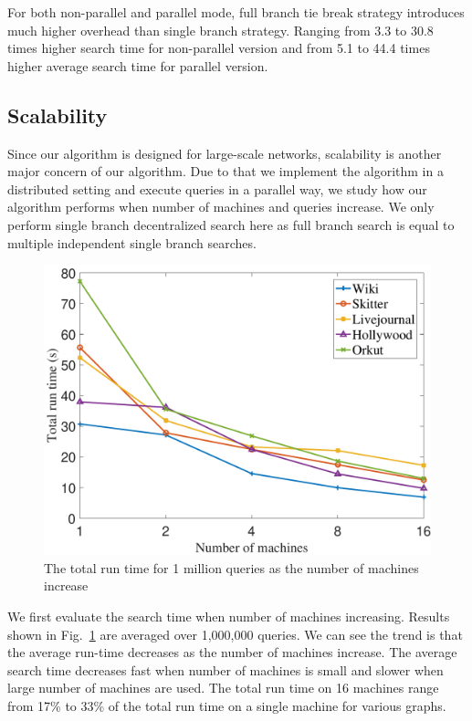 For both non-parallel and parallel mode, full branch tie break strategy introduces much higher overhead than single branch strategy. Ranging from 3.3 to 30.8 times higher search time for non-parallel version and from 5.1 to 44.4 times higher average search time for parallel version.

\subsection{Scalability}
\label{eval_scalability}

Since our algorithm is designed for large-scale networks, scalability is another major concern of our algorithm. Due to that we implement the algorithm in a distributed setting and execute queries in a parallel way, we study how our algorithm performs when number of machines and queries increase. We only perform single branch decentralized search here as full branch search is equal to multiple independent single branch searches.

\begin{figure}[t]
    \centering
    \includegraphics[width=\linewidth]{./figures/scale_machine.pdf}
    \caption{The total run time for 1 million queries as the number of machines increase}
    \label{fig:scale_machine}
\end{figure}

We first evaluate the search time when number of machines increasing. Results shown in Fig.~\ref{fig:scale_machine} are averaged over 1,000,000 queries. We can see the trend is that the average run-time decreases as the number of machines increase. The average search time decreases fast when number of machines is small and slower when large number of machines are used. The total run time on 16 machines range from 17\% to 33\% of the total run time on a single machine for various graphs.

